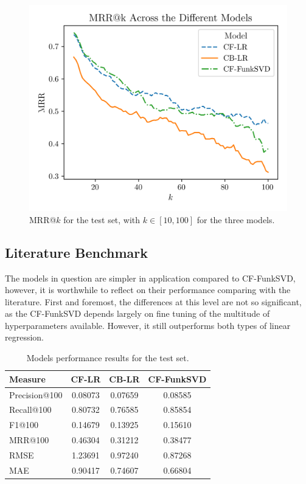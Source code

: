 \documentclass[conference]{IEEEtran}
\begin{document}
\begin{figure}[H]
    \centering
    \includegraphics[width=1\linewidth]{assets/results_mrrK.png}
    \caption{MRR@$k$ for the test set, with $k \in [10,100]$ for the three models.}
    \label{fig:results_mrrK}
\end{figure}

\subsection{Literature Benchmark}

The models in question are simpler in application compared to CF-FunkSVD, however, it is worthwhile to reflect on their performance comparing with the literature. First and foremost, the differences at this level are not so significant, as the CF-FunkSVD depends largely on fine tuning of the multitude of hyperparameters available. However, it still outperforms both types of linear regression.

\begin{table}[H]
\centering
\caption{Models performance results for the test set.}
\label{tab:atk_results_benchamarkpaper}
\begin{tabular}{lccc}
\toprule
\textbf{Measure} & \textbf{CF-LR} & \textbf{CB-LR} & \textbf{CF-FunkSVD} \\
\midrule
Precision@100 & 0.08073 & 0.07659 & 0.08585 \\
Recall@100 & 0.80732 & 0.76585 & 0.85854 \\
F1@100 & 0.14679 & 0.13925 & 0.15610 \\
MRR@100 & 0.46304 & 0.31212 & 0.38477 \\
RMSE & 1.23691 & 0.97240 & 0.87268 \\
MAE & 0.90417 & 0.74607 & 0.66804 \\
\bottomrule
\end{tabular}
\end{table}
\end{document}

